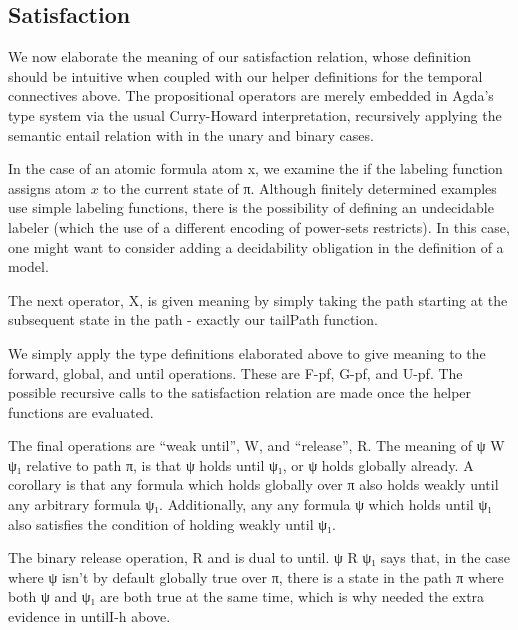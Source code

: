 \documentclass{article}
\newcommand{\green}[1]{\textcolor{hooker\'sgreen}{#1}}
\begin{document}
\subsection{Satisfaction}

We now elaborate the meaning of our satisfaction relation, whose definition
should be intuitive when coupled with our helper definitions for the temporal connectives above. The
propositional operators are merely embedded in Agda's type system via the usual
Curry-Howard interpretation, recursively applying the semantic entail relation with in
the unary and binary cases.

In the case of an atomic formula \green{atom x}, we examine the if the labeling
function assigns atom $x$ to the current state of π. Although finitely
determined examples use simple labeling functions, there is the possibility of
defining an undecidable labeler (which the use of a different encoding of
power-sets restricts). In this case, one might want to consider adding a
decidability obligation in the definition of a model.

The next operator, \green{X}, is given meaning by simply taking the path starting at
the subsequent state in the path - exactly our tailPath function.

We simply apply the type definitions elaborated above to give meaning to the
forward, global, and until operations. These are \green{F-pf}, \green{G-pf}, and
\green{U-pf}. The possible recursive calls to the satisfaction relation are made
once the helper functions are evaluated.

The final operations are ``weak until'', \green{W}, and ``release'', \green{R}. The meaning of ψ \green{W} ψ₁
relative to path π, is that ψ holds until ψ₁, or ψ holds globally
already. A corollary is that any formula which holds globally over π also holds
weakly until any arbitrary formula ψ₁. Additionally, any any formula ψ which
holds until ψ₁ also satisfies the condition of holding weakly until ψ₁.

The binary release operation, \green{R} and is dual to until. ψ \green{R} ψ₁ says that, in
the case where ψ isn't by default globally true over π, there is a state in the
path π where both ψ and ψ₁ are both true at the same time, which is why needed
the extra evidence in \green{untilI-h} above.
\end{document}

